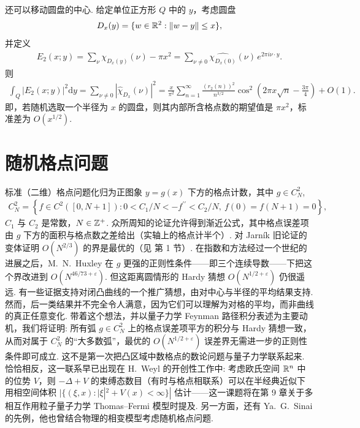 还可以移动圆盘的中心. 给定单位正方形 $Q$ 中的 $y$，考虑圆盘
\begin{align*}
  D_{x}(y)=\{w\in\mathbb{R}^{2}:\|w-y\|\leq x\},
\end{align*}
并定义
\begin{align*}
  E_{2}(x;y)=\sum_{\nu}\chi_{D_{x}(y)}(\nu)-\pi x^{2}
  =\sum_{\nu\neq 0}\widehat{\chi_{D_{x}(0)}}(\nu)\,e^{2\pi i\nu\cdot y}.
\end{align*}
则
\begin{align*}
  \int_{Q}\left|E_{2}(x;y)\right|^{2}\mathrm{d}y
  =\sum_{\nu\neq 0}\left|\widehat{\chi}_{D_{x}}(\nu)\right|^{2}
  =\frac{x}{\pi^{2}}\sum_{n=1}^{\infty}\frac{(r_{2}(n))^{2}}{n^{3/2}}
   \cos^{2}\left(2\pi x\sqrt{n}-\frac{3\pi}{4}\right)+O(1).
\end{align*}
即，若随机选取一个半径为 $x$ 的圆盘，则其内部所含格点数的期望值是 $\pi x^2$，标准差为 $O(x^{1/2})$.

\section{随机格点问题}

标准（二维）格点问题化归为正图象 $y = g(x)$ 下方的格点计数，其中 $g \in C_N^2$,
\begin{align*}
  C_{N}^{2}=\left\{f\in C^{2}([0,N+1]):
  0<C_{1}/N<-f^{\prime\prime}<C_{2}/N,\ f(0)=f(N+1)=0\right\},
\end{align*}
$C_1$ 与 $C_2$ 是常数，$N \in \mathbb{Z}^+$. 众所周知的论证允许得到渐近公式，其中格点误差项由 $g$ 下方的面积与格点数之差给出（实轴上的格点计半个）. 对 Jarník \cite{b166} 旧论证的变体证明 $O(N^{2/3})$ 的界是最优的（见 \cite{b164} 第 1 节）. 在指数和方法经过一个世纪的进展之后，M.~N.~Huxley \cite{b164} 在 $g$ 更强的正则性条件——即三个连续导数——下把这个界改进到 $O(N^{46/73+\varepsilon})$. 但这距离圆情形的 Hardy 猜想 $O(N^{1/2+\varepsilon})$ \cite{b161} 仍很遥远. 有一些证据支持对闭凸曲线的一个推广猜想，由对中心与半径的平均结果支持. 然而，后一类结果并不完全令人满意，因为它们可以理解为对格的平均，而非曲线的真正任意变化. 带着这个想法，并以量子力学 Feynman 路径积分表述为主要动机，我们将证明: 所有弧 $g \in C_N^2$ 上的格点误差项平方的积分与 Hardy 猜想一致，从而对属于 $C_N^2$ 的``大多数弧''，最优的 $O(N^{1/2+\varepsilon})$ 误差界无需进一步的正则性条件即可成立. 这不是第一次把凸区域中数格点的数论问题与量子力学联系起来. 恰恰相反，这一联系早已出现在 H.~Weyl 的开创性工作中: 考虑欧氏空间 $\mathbb{R}^n$ 中的位势 $V$，则 $-\Delta + V$ 的束缚态数目（有时与格点相联系）可以在半经典近似下用相空间体积 $|\{(\xi, x) : |\xi|^2 + V(x) < \infty\}|$ 估计——这一课题将在第 9 章关于多相互作用粒子量子力学 Thomas--Fermi 模型时提及. 另一方面，还有 Ya.~G.~Sinai 的先例，他也曾结合物理的相变模型考虑随机格点问题.

